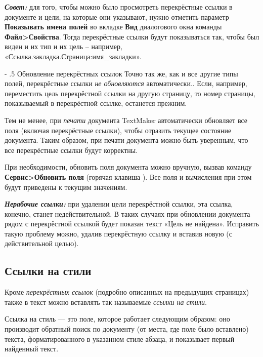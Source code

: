 ﻿\documentclass[a4paper,10pt]{article}
\makeatletter
\renewcommand\paragraph{%
   \@startsection{paragraph}{4}{0mm}%
      {-\baselineskip}%
      {.5\baselineskip}%
      {\normalfont\normalsize\bfseries}}
\makeatother
\begin{document}
\begin{mdframed}[backgroundcolor=blue!10]
\textbf{\textit{Совет:}} для того, чтобы можно было просмотреть перекрёстные ссылки в документе и цели, на которые они указывают, нужно отметить параметр \textbf{Показывать имена полей} во вкладке \textbf{Вид} диалогового окна команды \textbf{Файл>Свойства}. Тогда перекрёстные ссылки будут показываться так, чтобы был виден и их тип и их цель -- например, «{Ссылка.закладка.Страница:имя\_закладки}».
\end{mdframed}

\paragraph{Обновление перекрёстных ссылок}
Точно так же, как и все другие типы полей, перекрёстные ссылки \textit{не обновляются} автоматически.. Если, например, переместить цель перекрёстной ссылки на другую страницу, то номер страницы, показываемый в перекрёстной ссылке, останется прежним.

Тем не менее, при \textit{печати} документа TextMaker автоматически обновляет все поля (включая перекрёстные ссылки), чтобы отразить текущее состояние документа. Таким образом, при печати документа можно быть уверенным, что все перекрёстные ссылки будут корректны.

При необходимости, обновить поля документа можно вручную, вызвав команду \textbf{Сервис>Обновить поля} (горячая клавиша ). Все поля и вычисления при этом будут приведены к текущим значениям.

\begin{mdframed}[backgroundcolor=blue!10]
\textbf{\textit{Нерабочие ссылки:}} при удалении цели перекрёстной ссылки, эта ссылка, конечно, станет недействительной. В таких случаях при обновлении документа рядом с перекрёстной ссылкой будет показан текст «Цель не найдена». Исправить такую проблему можно, удалив перекрёстную ссылку и вставив новую (с действительной целью).
\end{mdframed}

\subsection{Ссылки на стили} \label{sec:ссылкинастили}
Кроме \textit{перекрёстных ссылок} (подробно описанных на предыдущих страницах) также в текст можно вставлять так называемые \textit{ссылки на стили}.

Ссылка на стиль — это поле, которое работает следующим образом: оно производит обратный поиск по документу (от места, где поле было вставлено) текста, форматированного в указанном стиле абзаца, и показывает первый найденный текст.
\end{document}
